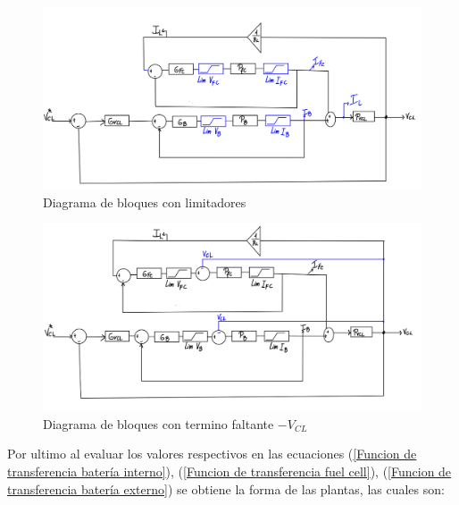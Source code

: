 
\begin{figure}[htbp]
    \centering
    \includegraphics[width=0.85\linewidth]{img/Diagrama de bloques 3.png}
    \caption{Diagrama de bloques con limitadores}
    \label{fig:Diagrama de bloques 3}
\end{figure}
\begin{figure}[htbp]
    \centering
    \includegraphics[width=0.85\linewidth]{img/Diagrama de bloques 4 final.png}
    \caption{Diagrama de bloques con termino faltante $-V_{CL}$}
    \label{fig:Diagrama de bloques 4}
\end{figure}

Por ultimo al evaluar los valores respectivos en las ecuaciones (\ref{Funcion de transferencia batería interno}), (\ref{Funcion de transferencia fuel cell}), (\ref{Funcion de transferencia batería externo}) se obtiene la forma de las plantas, las cuales son:


